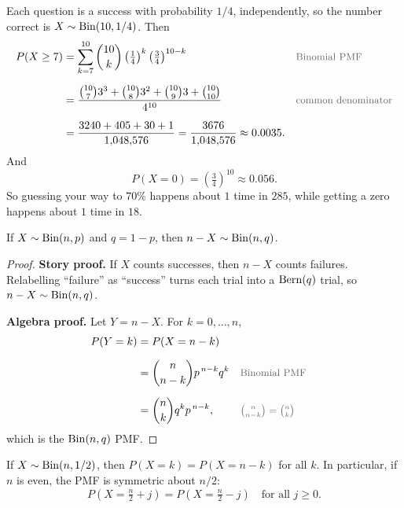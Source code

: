 \medskip

\begin{solution}
Each question is a success with probability $1/4$, independently, so the number correct is $X \sim \operatorname{Bin}(10, 1/4)$. Then
\medskip
\begin{align*}
P(X \ge 7)
  &= \sum_{k=7}^{10} \binom{10}{k} \left(\tfrac{1}{4}\right)^{k} \left(\tfrac{3}{4}\right)^{10-k}
  && \by{Binomial PMF} \\[0.6em]
  &= \frac{\binom{10}{7} 3^{3} + \binom{10}{8} 3^{2} + \binom{10}{9} 3 + \binom{10}{10}}{4^{10}}
  && \by{common denominator} \\[0.6em]
  &= \frac{3240 + 405 + 30 + 1}{1{,}048{,}576}
   = \frac{3676}{1{,}048{,}576}
   \approx 0.0035.
\end{align*}
\medskip
And
\medskip
\[
P(X = 0) = \left(\tfrac{3}{4}\right)^{10} \approx 0.056.
\]
\medskip
So guessing your way to $70\%$ happens about $1$ time in $285$, while getting a zero happens about $1$ time in $18$.
\end{solution}

\bigskip

\begin{theorem}\label{thm:binflip}
If $X \sim \operatorname{Bin}(n, p)$ and $q = 1 - p$, then $n - X \sim \operatorname{Bin}(n, q)$.
\end{theorem}

\medskip

\begin{proof}
\textbf{Story proof.} If $X$ counts successes, then $n - X$ counts failures. Relabelling ``failure'' as ``success'' turns each trial into a $\operatorname{Bern}(q)$ trial, so $n - X \sim \operatorname{Bin}(n, q)$.

\medskip

\textbf{Algebra proof.} Let $Y = n - X$. For $k = 0, \dots, n$,
\medskip
\begin{align*}
P(Y = k)
  &= P(X = n - k) \\[0.6em]
  &= \binom{n}{n-k} p^{\,n-k} q^{k}
  && \by{Binomial PMF} \\[0.6em]
  &= \binom{n}{k} q^{k} p^{\,n-k},
  && \by{$\tbinom{n}{n-k} = \tbinom{n}{k}$}
\end{align*}
\medskip
which is the $\operatorname{Bin}(n, q)$ PMF.
\end{proof}

\bigskip

\begin{corollary}[Symmetry when $p = 1/2$]\label{cor:binsym}
If $X \sim \operatorname{Bin}(n, 1/2)$, then $P(X = k) = P(X = n - k)$ for all $k$. In particular, if $n$ is even, the PMF is symmetric about $n/2$:
\medskip
\[
P\!\left(X = \tfrac{n}{2} + j\right) = P\!\left(X = \tfrac{n}{2} - j\right) \quad \text{for all } j \ge 0.
\]
\end{corollary}

